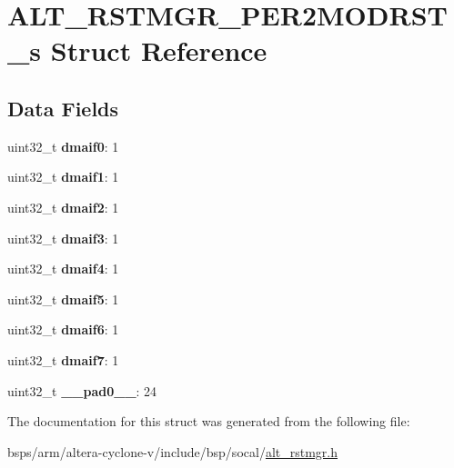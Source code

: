 \hypertarget{structALT__RSTMGR__PER2MODRST__s}{}\section{A\+L\+T\+\_\+\+R\+S\+T\+M\+G\+R\+\_\+\+P\+E\+R2\+M\+O\+D\+R\+S\+T\+\_\+s Struct Reference}
\label{structALT__RSTMGR__PER2MODRST__s}
\subsection*{Data Fields}
\begin{DoxyCompactItemize}
\item 
\mbox{\label{structALT__RSTMGR__PER2MODRST__s_a3a27a2b7aac7c6c9b6fb0efb9a7eb77d}} 
uint32\+\_\+t {\bfseries dmaif0}\+: 1
\item 
\mbox{\label{structALT__RSTMGR__PER2MODRST__s_a0a8db5447ca1413d124a23c3b7f89af8}} 
uint32\+\_\+t {\bfseries dmaif1}\+: 1
\item 
\mbox{\label{structALT__RSTMGR__PER2MODRST__s_ad013b6df3572ea4ecd922db59cb9e315}} 
uint32\+\_\+t {\bfseries dmaif2}\+: 1
\item 
\mbox{\label{structALT__RSTMGR__PER2MODRST__s_a6463532f2728ac919736a47a39d43e4a}} 
uint32\+\_\+t {\bfseries dmaif3}\+: 1
\item 
\mbox{\label{structALT__RSTMGR__PER2MODRST__s_a15532aae3bbaf1de9726021c4f6999db}} 
uint32\+\_\+t {\bfseries dmaif4}\+: 1
\item 
\mbox{\label{structALT__RSTMGR__PER2MODRST__s_ab5c80bbeac60e258e48e1ea50e113151}} 
uint32\+\_\+t {\bfseries dmaif5}\+: 1
\item 
\mbox{\label{structALT__RSTMGR__PER2MODRST__s_a0aa7a816a17cbe922bdb733edff889e0}} 
uint32\+\_\+t {\bfseries dmaif6}\+: 1
\item 
\mbox{\label{structALT__RSTMGR__PER2MODRST__s_a6c13d37150665062c2a789a26d124116}} 
uint32\+\_\+t {\bfseries dmaif7}\+: 1
\item 
\mbox{\label{structALT__RSTMGR__PER2MODRST__s_a0c2b123d9a45a225cf943346c52d2013}} 
uint32\+\_\+t {\bfseries \+\_\+\+\_\+pad0\+\_\+\+\_\+}\+: 24
\end{DoxyCompactItemize}


The documentation for this struct was generated from the following file\+:\begin{DoxyCompactItemize}
\item 
bsps/arm/altera-\/cyclone-\/v/include/bsp/socal/\mbox{\hyperlink{alt__rstmgr_8h}{alt\+\_\+rstmgr.\+h}}\end{DoxyCompactItemize}

